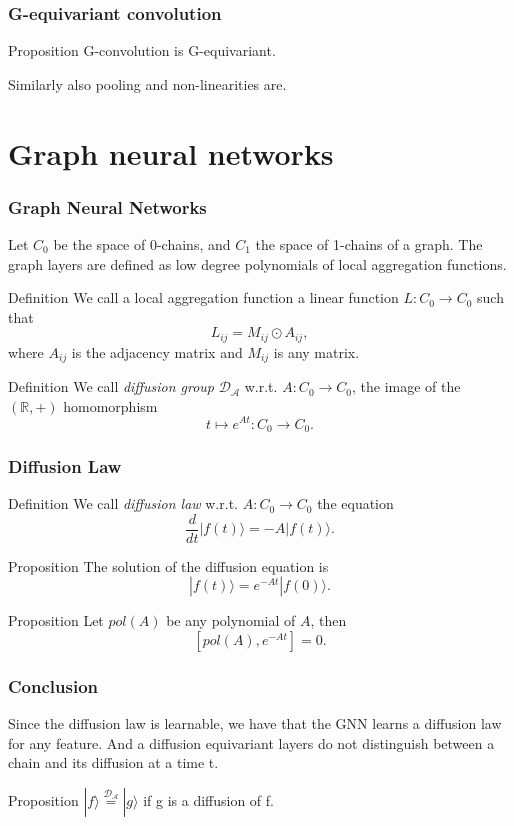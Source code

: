 \documentclass{beamer}
\newcommand{\R}{\mathbb{R}}
\newcommand{\mc}[1]{\mathcal{#1}}
\newcommand{\ii}[1]{\textit{#1}}
\newcommand{\req}[1]{\stackrel{#1}{=}}
\newcommand{\ket}[1]{| #1 \rangle}
\begin{document}
\begin{frame}
    \frametitle{G-equivariant convolution}
    \begin{alertblock}{Proposition}
        G-convolution is G-equivariant.
    \end{alertblock}
    Similarly also pooling and non-linearities are.
\end{frame}

\section{Graph neural networks}

\begin{frame}
    \frametitle{Graph Neural Networks}
    Let $C_0$ be the space of 0-chains, and $C_1$ the space of 1-chains of a graph.
    The graph layers are defined as low degree polynomials of local aggregation functions.
    \begin{block}{Definition}
        We call a local aggregation function a linear function $L : C_0 \to C_0$ such that
        \[ L_{ij} = M_{ij} \odot A_{ij}, \]
        where $A_{ij}$ is the adjacency matrix and $M_{ij}$ is any matrix. 
    \end{block}
    \begin{block}{Definition}
        We call \ii{diffusion group} $\mc{D_A}$ w.r.t. $A : C_0 \to C_0$, the image of the $(\R,+)$ homomorphism
        \[ t \mapsto e^{At} : C_0 \to C_0. \]
    \end{block}
\end{frame}

\begin{frame}
    \frametitle{Diffusion Law}
    \begin{block}{Definition}
        We call \ii{diffusion law} w.r.t. $A : C_0 \to C_0$ the equation
        \[ \frac{d}{dt}\ket{f(t)} = -A\ket{f(t)}.\]
    \end{block}
    \begin{alertblock}{Proposition}
        The solution of the diffusion equation is
        \[  \ket{f(t)} = e^{-At}\ket{f(0)}.\]
    \end{alertblock}
    \begin{alertblock}{Proposition}
        Let $pol(A)$ be any polynomial of $A$, then
        \[ [pol(A),e^{-At}] = 0.\]
    \end{alertblock}
\end{frame}

\begin{frame}
    \frametitle{Conclusion}
    Since the diffusion law is learnable, we have that the GNN learns a diffusion law for any feature.
    And a diffusion equivariant layers do not distinguish between a chain and its diffusion at a time t.
    \begin{block}{Proposition}
        $\ket{f} \req{\mc{D_A}} \ket{g}$ if g is a diffusion of f.
    \end{block}
\end{frame}
\end{document}
